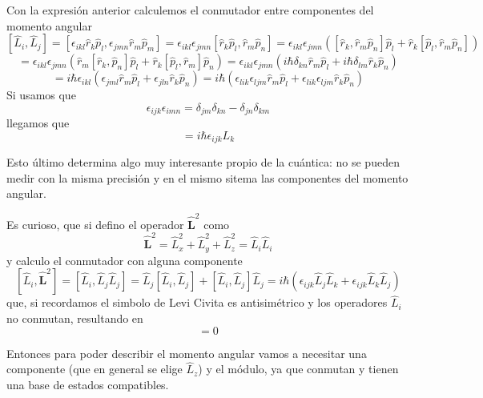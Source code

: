 Con la expresión anterior calculemos el conmutador entre componentes del momento angular
\[ [\hat{L}_i, \hat{L}_j] = [\epsilon_{i k l} \hat{r}_k \hat{p}_l, \epsilon_{j m n} \hat{r}_m \hat{p}_m] =  \epsilon_{i k l} \epsilon_{j m n} [\hat{r}_k \hat{p}_l, \hat{r}_m \hat{p}_n] = \epsilon_{i k l} \epsilon_{j m n} ([\hat{r}_k,\hat{r}_m \hat{p}_n] \hat{p}_l + \hat{r}_k [\hat{p}_l, \hat{r}_m \hat{p}_n]) \]
\[ = \epsilon_{i k l} \epsilon_{j m n} (\hat{r}_m [\hat{r}_k, \hat{p}_n]        \hat{p}_l + \hat{r}_k [\hat{p}_l, \hat{r}_m] \hat{p}_n) = \epsilon_{i k l} \epsilon_{j m n} (i \hbar \delta_{k n} \hat{r}_m \hat{p}_l + i \hbar \delta_{l m} \hat{r}_k \hat{p}_n) \] 
\[ = i \hbar \epsilon_{i k l} (\epsilon_{j m l} \hat{r}_m \hat{p}_l + \epsilon_{j l n}  \hat{r}_k \hat{p}_n) = i \hbar (\epsilon_{l i k} \epsilon_{l j m} \hat{r}_m \hat{p}_l + \epsilon_{l i k} \epsilon_{l j m} \hat{r}_k \hat{p}_n)\] 
Si usamos que 
\begin{equation}
    \epsilon_{ijk} \epsilon_{imn}=\delta_{j m} \delta_{kn} - \delta_{jn} \delta_{km}
\end{equation}
llegamos que
\begin{equation}
    [\hat{L}_i, \hat{L}_j] = i \hbar \epsilon_{i j k} L_k
\end{equation}

Esto último determina algo muy interesante propio de la cuántica: no se pueden medir con la misma precisión y en el mismo sitema las componentes del momento angular.

Es curioso, que si defino el operador $\hat{\boldsymbol{L}}^2$ como
\begin{equation}
    \hat{\boldsymbol{L}}^2 = \hat{L}^2_x+\hat{L}^2_y+\hat{L}^2_z = \hat{L}_i \hat{L}_i
\end{equation}
y calculo el conmutador con alguna componente
\[ [\hat{L}_i, \hat{\boldsymbol{L}}^2] = [\hat{L}_i, \hat{L}_j \hat{L}_j] = \hat{L}_j [\hat{L}_i, \hat{L}_j] + [\hat{L}_i, \hat{L}_j] \hat{L}_j = i \hbar (\epsilon_{i j k} \hat{L}_j \hat{L}_k + \epsilon_{i j k} \hat{L}_k \hat{L}_j)\]
que, si recordamos el simbolo de Levi Civita es antisimétrico y los operadores $\hat{L}_i$ no conmutan, resultando en 
\begin{equation}
    [\hat{L}_i, \hat{\boldsymbol{L}}^2] = 0
\end{equation}

Entonces para poder describir el momento angular vamos a necesitar una componente (que en general se elige $\hat{L}_z$) y el módulo, ya que conmutan y tienen una base de estados compatibles.

